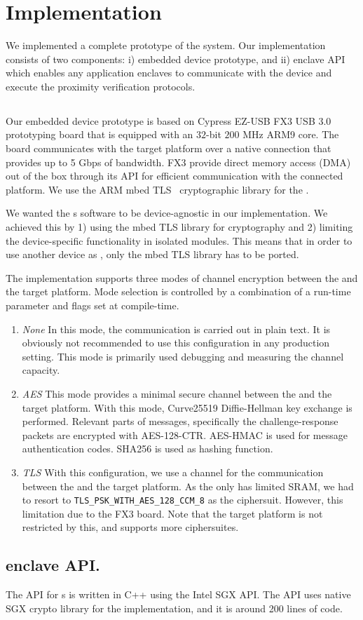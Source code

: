 \section{Implementation}
\label{sec:implementation}

We implemented a complete prototype of the \name system. Our implementation consists of two components: i) \device embedded device prototype, and ii) \name enclave API which enables any application enclaves to communicate with the \device device and execute the proximity verification protocols.

\subsection{\device} 

Our embedded device prototype is based on Cypress EZ-USB FX3 USB 3.0 prototyping board that is equipped with an $32$-bit $200$ MHz ARM9 core. The board communicates with the target platform over a native  connection that provides up to 5 Gbps of bandwidth. FX3 provide direct memory access (DMA) out of the box through its API for efficient communication with the connected platform. We use the ARM mbed TLS~\cite{mbed} cryptographic library for the \tls.

 We wanted the \device{}s software to be device-agnostic in our implementation. We achieved this by 1) using the mbed TLS library for cryptography and 2) limiting the device-specific functionality in isolated modules. This means that in order to use another device as \device, only the mbed TLS library has to be ported.

 The implementation supports three modes of channel encryption between the \device and the target platform. Mode selection is controlled by a combination of a run-time parameter and flags set at compile-time.

\begin{enumerate}
  \item \emph{None} In this mode, the communication is carried out in plain text. It is obviously not recommended to use this configuration in any production setting. This mode is primarily used debugging and measuring the channel capacity.
  \item \emph{AES} This mode provides a minimal secure channel between the \device and the target platform. With this mode, Curve25519 Diffie-Hellman key exchange is performed. Relevant parts of messages, specifically the challenge-response packets are encrypted with AES-128-CTR. AES-HMAC is used for message authentication codes. SHA256 is used as hashing function.
  \item \emph{TLS} With this configuration, we use a \tls channel for the communication between the \device and the target platform. As the \device only has limited SRAM, we had to resort to \texttt{TLS\_PSK\_WITH\_AES\_128\_CCM\_8} as the ciphersuit. However, this limitation due to the FX3 board. Note that the target platform is not restricted by this, and supports more ciphersuites. 
\end{enumerate}



\subsection{\name enclave API.} 
The \name API for \app{}s is written in C++ using the Intel SGX API. The API uses native SGX crypto library for the \tls implementation, and it is around 200 lines of code.